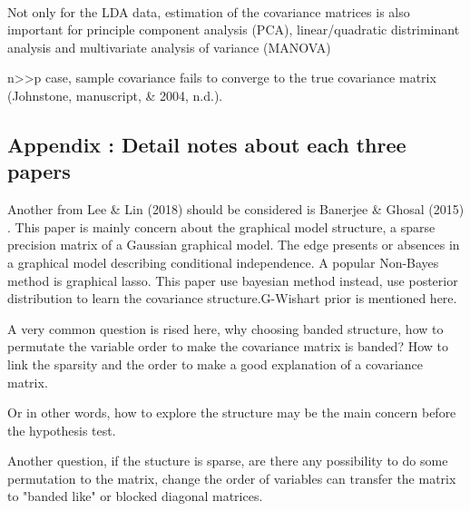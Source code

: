 \documentclass{beamer}
\begin{document}
\begin{frame}
\

Not only for the LDA data, estimation of the covariance matrices is also
important for principle component analysis (PCA), linear/quadratic
distriminant analysis and multivariate analysis of variance (MANOVA)


n\textgreater{}\textgreater{}p case, sample covariance fails to converge
to the true covariance matrix (Johnstone, manuscript, \& 2004, n.d.).

\hypertarget{appendix-detail-notes-about-each-three-papers}{%
\subsection{Appendix : Detail notes about each three
papers}\label{appendix-detail-notes-about-each-three-papers}}
\end{frame}

\begin{frame}

Another from Lee \& Lin (2018) should be considered is Banerjee \&
Ghosal (2015) . This paper is mainly concern about the graphical model
structure, a sparse precision matrix of a Gaussian graphical model. The
edge presents or absences in a graphical model describing conditional
independence. A popular Non-Bayes method is graphical lasso. This paper
use bayesian method instead, use posterior distribution to learn the
covariance structure.G-Wishart prior is mentioned here.
\end{frame}


\begin{frame}
A very common question is rised here, why choosing banded structure, how to permutate the variable order to make the covariance matrix is banded? How to link the sparsity and the order to make a good explanation of a covariance matrix.

Or in other words, how to explore the structure may be the main concern before the hypothesis test.

Another question, if the stucture is sparse, are there any possibility to do some permutation to the matrix, change the order of variables can transfer the matrix to "banded like" or blocked diagonal matrices.
\end{frame}
\end{document}
